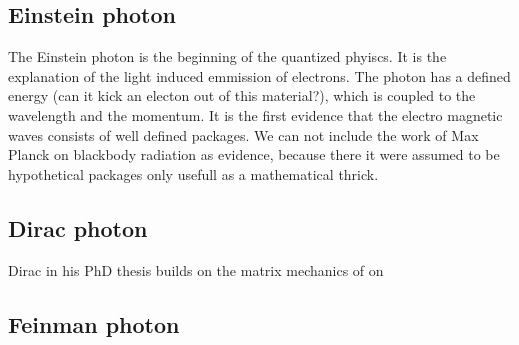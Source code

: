 \subsection{Einstein photon}
The Einstein photon is the beginning of the quantized phyiscs. It is the explanation of the light induced emmission of electrons. The photon has a defined energy (can it kick an electon out of this material?), which is coupled to the wavelength and the momentum. It is the first evidence that the electro magnetic waves consists of well defined packages. We can not include the work of Max Planck on blackbody radiation as evidence, because there it were assumed to be hypothetical packages only usefull as a mathematical thrick.


\subsection{Dirac photon}
Dirac in his PhD thesis builds on the matrix mechanics of on 


\subsection{Feinman photon}



